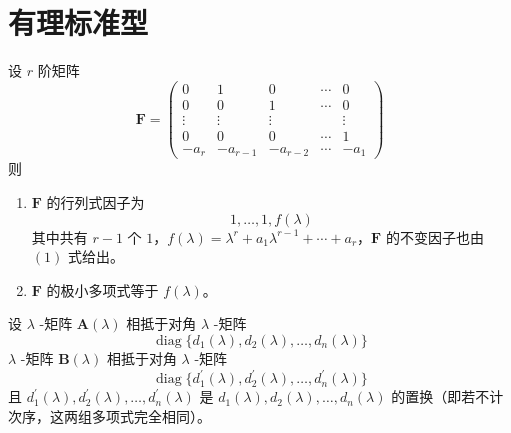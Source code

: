 
\section{有理标准型}

\begin{lemma}\label{lemma-7.4.1}
    设 $r$ 阶矩阵
    \[
        \bm{F} = \begin{pmatrix}
            0      & 1          & 0          & \cdots & 0      \\
            0      & 0          & 1          & \cdots & 0      \\
            \vdots & \vdots     & \vdots     & \      & \vdots \\
            0      & 0          & 0          & \cdots & 1      \\
            -a_{r} & -a_{r - 1} & -a_{r - 2} & \cdots & -a_{1}
        \end{pmatrix}
    \]
    则
    \begin{enumerate}
        \item $\bm{F}$ 的行列式因子为
              \begin{equation}\tag{1}
                  1, \ldots, 1, f(\lambda)
              \end{equation}
              其中共有 $r - 1$ 个 $1$，$f(\lambda) = \lambda^r + a_{1}\lambda^{r - 1} + \cdots + a_{r}$，$\bm{F}$ 的不变因子也由 $(1)$ 式给出。
        \item $\bm{F}$ 的极小多项式等于 $f(\lambda)$。
    \end{enumerate}
\end{lemma}

\begin{lemma}
    设 $\lambda$ -矩阵 $\bm{A}(\lambda)$ 相抵于对角 $\lambda$ -矩阵
    \[
        \operatorname{diag}\{ d_{1}(\lambda), d_{2}(\lambda), \ldots, d_{n}(\lambda) \}
    \]
    $\lambda$ -矩阵 $\bm{B}(\lambda)$ 相抵于对角 $\lambda$ -矩阵
    \[
        \operatorname{diag}\{ d_{1}^{'}(\lambda), d_{2}^{'}(\lambda), \ldots, d_{n}^{'}(\lambda) \}
    \]
    且 $d_{1}^{'}(\lambda), d_{2}^{'}(\lambda), \ldots, d_{n}^{'}(\lambda)$ 是 $d_{1}(\lambda), d_{2}(\lambda), \ldots, d_{n}(\lambda)$ 的置换（即若不计次序，这两组多项式完全相同）。
\end{lemma}

